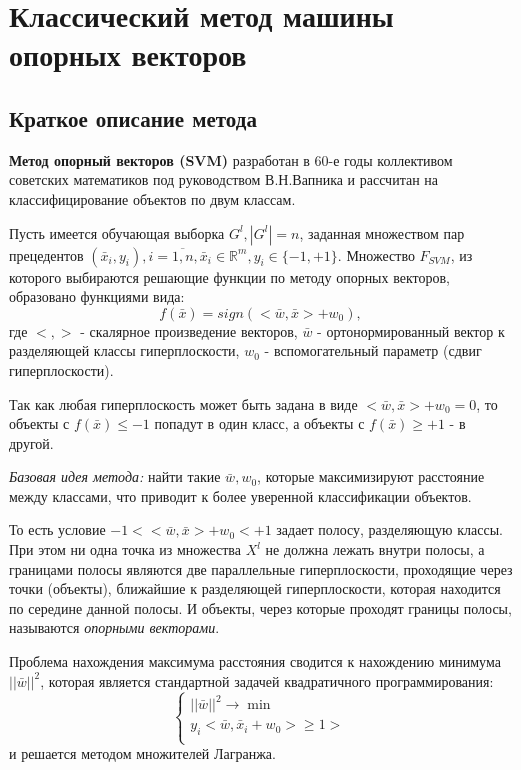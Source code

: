 \documentclass[12pt,a4paper]{article}
\begin{document}
\section{Классический метод машины опорных векторов}
\subsection{Краткое описание метода}
\textbf{Метод опорный векторов (SVM)} разработан в 60-е годы коллективом советских математиков под руководством В.Н.Вапника и рассчитан на классифицирование объектов по двум классам.

Пусть имеется обучающая выборка $G^l,|G^l|=n$, заданная множеством пар прецедентов $(\bar{x}_i,y_i),i=\overline{1,n},\bar{x}_i\in\mathbb{R}^m,y_i\in\{-1,+1\}$. Множество $F_{SVM}$, из которого выбираются решающие функции по методу опорных векторов, образовано функциями вида:
\begin{equation}
    f(\bar{x})=sign(<\bar{w},\bar{x}>+w_0),
\end{equation}
где $<,>$ - скалярное произведение векторов, $\bar{w}$ - ортонормированный вектор к разделяющей классы гиперплоскости, $w_0$ - вспомогательный параметр (сдвиг гиперплоскости).

Так как любая гиперплоскость может быть задана в виде $<\bar{w},\bar{x}>+w_0=0$, то объекты с $f(\bar{x})\leq-1$ попадут в один класс, а объекты с $f(\bar{x})\geq+1$ - в другой.

\textit{Базовая идея метода:} найти такие $\bar{w},w_0$, которые максимизируют расстояние между классами, что приводит к более уверенной классификации объектов.

То есть условие $-1<<\bar{w},\bar{x}>+w_0<+1$ задает полосу, разделяющую классы. При этом ни одна точка из множества $X^l$ не должна лежать внутри полосы, а границами полосы являются две параллельные гиперплоскости, проходящие через точки (объекты), ближайшие к разделяющей гиперплоскости, которая находится по середине данной полосы. И объекты, через которые проходят границы полосы, называются \textit{опорными векторами}.

Проблема нахождения максимума расстояния сводится к нахождению минимума $||\bar{w}||^2$, которая является стандартной задачей квадратичного программирования:
\begin{equation}
    \left\{
    \begin{array}{ll}
        ||\bar{w}||^2\rightarrow\min\\
        y_i<\bar{w},\bar{x}_i+w_0>\geq1>\\
    \end{array}
    \right.
\end{equation}
и решается методом множителей Лагранжа.
\end{document}

